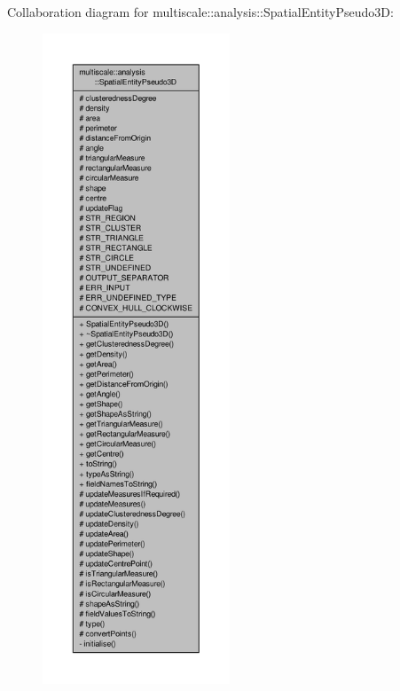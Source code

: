 Collaboration diagram for multiscale\-:\-:analysis\-:\-:Spatial\-Entity\-Pseudo3\-D\-:\nopagebreak
\begin{figure}[H]
\begin{center}
\leavevmode
\includegraphics[height=550pt]{classmultiscale_1_1analysis_1_1SpatialEntityPseudo3D__coll__graph}
\end{center}
\end{figure}
